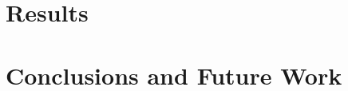 \documentclass[journal]{vgtc}                %
\begin{document}

\section{Results}



\section{Conclusions and Future Work}


%


\end{document}
